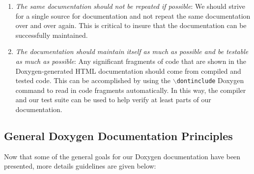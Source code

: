 \begin{enumerate}
{}\item\textit{The same documentation should not be repeated if possible}: We
should strive for a single source for documentation and not repeat the same
documentation over and over again.  This is critical to insure that the
documentation can be successfully maintained.

{}\item\textit{The documentation should maintain itself as much as possible
and be testable as much as possible}: Any significant fragments of code that
are shown in the Doxygen-generated HTML documentation should come from
compiled and tested code.  This can be accomplished by using the
{}\texttt{$\backslash$dontinclude} Doxygen command to read in code fragments
automatically.  In this way, the compiler and our test suite can be used to
help verify at least parts of our documentation.

\end{enumerate}

%
\subsection{General Doxygen Documentation Principles}
%

Now that some of the general goals for our Doxygen documentation have been
presented, more details guidelines are given below:

